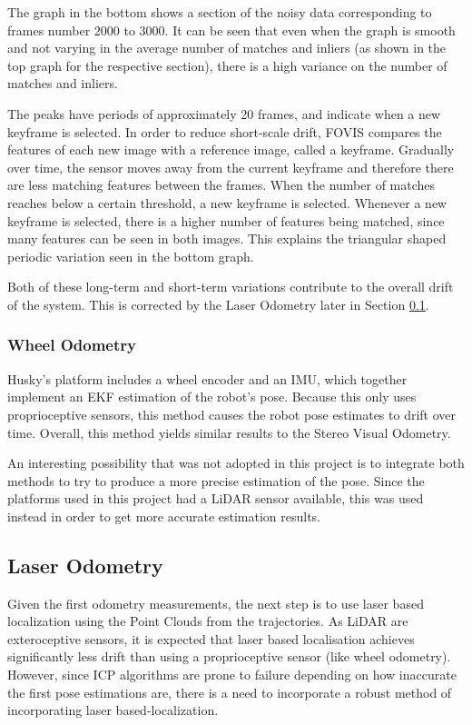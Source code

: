 \documentclass[11pt]{article}
\begin{document}
The graph in the bottom shows a section of the noisy data corresponding to frames number 2000 to 3000. It can be seen that even when the graph is smooth and not varying in the average number of matches and inliers (as shown in the top graph for the respective section), there is a high variance on the number of matches and inliers. 

The peaks have periods of approximately 20 frames, and indicate when a new keyframe is selected. In order to reduce short-scale drift, FOVIS compares the features of each new image with a reference image, called a keyframe. Gradually over time, the sensor moves away from the current keyframe and therefore there are less matching features between the frames. When the number of matches reaches below a certain threshold, a new keyframe is selected. Whenever a new keyframe is selected, there is a higher number of features being matched, since many features can be seen in both images. This explains the triangular shaped periodic variation seen in the bottom graph.

Both of these long-term and short-term variations contribute to the overall drift of the system. This is corrected by the Laser Odometry later in Section \ref{subs:LaserOd}.	
	
	\subsubsection*{Wheel Odometry}

Husky's platform includes a wheel encoder and an IMU, which together implement an EKF estimation of the robot's pose. Because this only uses proprioceptive sensors, this method causes the robot pose estimates to drift over time. Overall, this method yields similar results to the Stereo Visual Odometry.

An interesting possibility that was not adopted in this project is to integrate both methods to try to produce a more precise estimation of the pose. Since the platforms used in this project had a LiDAR sensor available, this was used instead in order to get more accurate estimation results.

	\subsection{Laser Odometry}
	\label{subs:LaserOd}
Given the first odometry measurements, the next step is to use laser based localization using the Point Clouds from the trajectories. As LiDAR are exteroceptive sensors, it is expected that laser based localisation achieves significantly less drift than using a proprioceptive sensor (like wheel odometry). However, since ICP algorithms are prone to failure depending on how inaccurate the first pose estimations are, there is a need to incorporate a robust method of incorporating laser based-localization.
	
\end{document}
